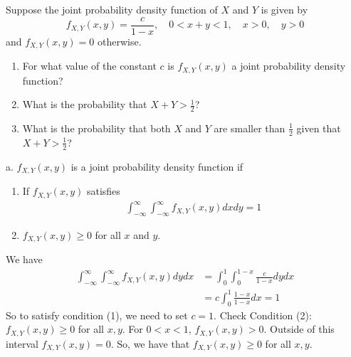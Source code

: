 \begin{exercise}
Suppose the joint probability density function of $X$ and $Y$ is given by
\begin{equation*}
    f_{X,Y}(x,y) = \frac{c}{1-x}, \quad 0<x+y<1, \quad x>0, \quad y>0
\end{equation*}
and $f_{X,Y}(x,y)=0$ otherwise.
\begin{enumerate}
\item
For what value of the constant $c$ is $f_{X,Y}(x,y)$ a joint probability density function?
\item     What is the probability that $X+Y>\frac{1}{2}$?
\item     What is the probability that both $X$ and $Y$ are smaller than $\frac{1}{2}$ given that $X+Y>\frac{1}{2}$?
\end{enumerate}
\begin{solution}
a.        $f_{X,Y}(x,y)$ is a joint probability density function if
        \begin{enumerate}
            \item If $f_{X,Y}(x,y)$ satisfies
            \begin{align*}
                \int_{-\infty}^{\infty}\int_{-\infty}^{\infty}f_{X,Y}(x,y)dxdy = 1
            \end{align*}
            \item $f_{X,Y}(x,y)\geq 0$ for all $x$ and $y$.
        \end{enumerate}

        We have
        \begin{align*}
            \int_{-\infty}^{\infty}\int_{-\infty}^{\infty}f_{X,Y}(x,y)dydx& = \int_{0}^{1}\int_{0}^{1-x} \frac{c}{1-x}dydx \\
            &= c\int_{0}^{1}\frac{1-x}{1-x}dx = 1
        \end{align*}
        So to satisfy condition (1), we need to set $c=1$. \newline
        Check Condition (2): $f_{X,Y}(x,y)\geq 0$ for all $x,y$. \newline
        For $0<x<1$, $f_{X,Y}(x,y)> 0$. Outside of this interval $f_{X,Y}(x,y)=0$. So, we have that $f_{X,Y}(x,y)\geq 0$ for all $x,y$.\newline


\end{solution}
\end{exercise}
